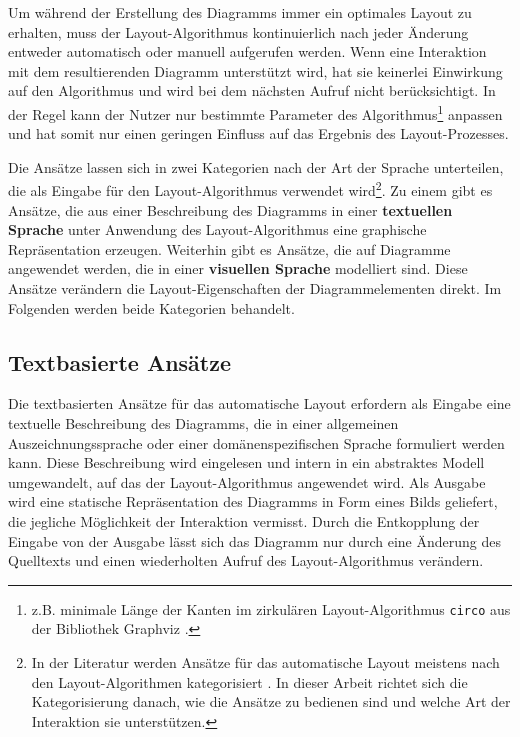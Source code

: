 Um während der Erstellung des Diagramms immer ein optimales Layout zu erhalten, muss der Layout-Algorithmus kontinuierlich nach jeder Änderung entweder automatisch oder manuell aufgerufen werden. Wenn eine Interaktion mit dem resultierenden Diagramm unterstützt wird, hat sie keinerlei Einwirkung auf den Algorithmus und wird bei dem nächsten Aufruf nicht berücksichtigt. In der Regel kann der Nutzer nur bestimmte Parameter des Algorithmus\footnote{z.B. minimale Länge der Kanten im zirkulären Layout-Algorithmus \lstinline{circo} aus der Bibliothek Graphviz \cite{NorthGansner14Dot-Manual}.} anpassen und hat somit nur einen geringen Einfluss auf das Ergebnis des Layout-Prozesses.

Die Ansätze lassen sich in zwei Kategorien nach der Art der Sprache unterteilen, die als Eingabe für den Layout-Algorithmus verwendet wird\footnote{In der Literatur werden Ansätze für das automatische Layout meistens nach den Layout-Algorithmen kategorisiert \cite[S.39ff]{Fuhrmann11On-the-Pragmatics} \cite[S.32ff]{Eichelberger05Aesthetics}. In dieser Arbeit richtet sich die Kategorisierung danach, wie die Ansätze zu bedienen sind und welche Art der Interaktion sie unterstützen.}. Zu einem gibt es Ansätze, die aus einer Beschreibung des Diagramms in einer \textbf{textuellen Sprache} unter Anwendung des Layout-Algorithmus eine graphische Repräsentation erzeugen. Weiterhin gibt es Ansätze, die auf Diagramme angewendet werden, die in einer \textbf{visuellen Sprache} modelliert sind. Diese Ansätze verändern die Layout-Eigenschaften der Diagrammelementen direkt. Im Folgenden werden beide Kategorien behandelt.


\subsection{Textbasierte Ansätze}
\label{subsec:text-based-approaches}

Die textbasierten Ansätze für das automatische Layout erfordern als Eingabe eine textuelle Beschreibung des Diagramms, die in einer allgemeinen Auszeichnungssprache oder einer domänenspezifischen Sprache formuliert werden kann. Diese Beschreibung wird eingelesen und intern in ein abstraktes Modell umgewandelt, auf das der Layout-Algorithmus angewendet wird. Als Ausgabe wird eine statische Repräsentation des Diagramms in Form eines Bilds geliefert, die jegliche Möglichkeit der Interaktion vermisst. Durch die Entkopplung der Eingabe von der Ausgabe lässt sich das Diagramm nur durch eine Änderung des Quelltexts und einen wiederholten Aufruf des Layout-Algorithmus verändern.

